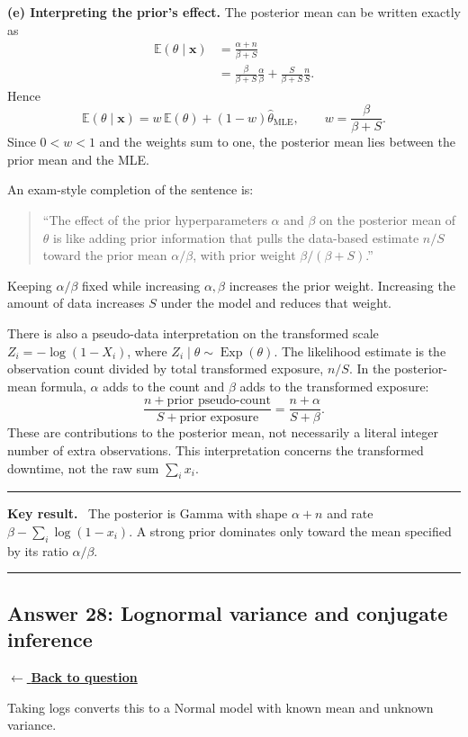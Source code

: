 \documentclass[11pt,a4paper]{article}
\newcommand{\xvec}{\boldsymbol{x}}
\newcommand{\E}{\mathbb{E}}
\newcommand{\answernav}[1]{%
  \label{answer:#1}%
  \noindent\hyperref[question:#1]{$\leftarrow$ \textbf{Back to question}}%
  \par\smallskip}
\newenvironment{keyresult}
  {\begin{center}\begin{minipage}{0.92\linewidth}\color{statblue}%
   \hrule\vspace{6pt}\textbf{Key result.}\ }
  {\vspace{6pt}\hrule\end{minipage}\end{center}}
\begin{document}
\textbf{(e) Interpreting the prior's effect.}
The posterior mean can be written exactly as
\[
\begin{aligned}
\E(\theta\mid\xvec)
&=\frac{\alpha+n}{\beta+S}\\
&=\frac{\beta}{\beta+S}\frac{\alpha}{\beta}
+\frac{S}{\beta+S}\frac nS.
\end{aligned}
\]
Hence
\[
\boxed{\E(\theta\mid\xvec)
=w\,\E(\theta)+(1-w)\widehat\theta_{\mathrm{MLE}},
\qquad w=\frac{\beta}{\beta+S}.}
\]
Since $0<w<1$ and the weights sum to one, the posterior mean lies between
the prior mean and the MLE.

An exam-style completion of the sentence is:
\begin{quote}
``The effect of the prior hyperparameters $\alpha$ and $\beta$ on the
posterior mean of $\theta$ is like adding prior information that pulls the
data-based estimate $n/S$ toward the prior mean $\alpha/\beta$, with prior
weight $\beta/(\beta+S)$.''
\end{quote}
Keeping $\alpha/\beta$ fixed while increasing $\alpha,\beta$ increases
the prior weight. Increasing the amount of data increases $S$ under the
model and reduces that weight.

There is also a pseudo-data interpretation on the transformed scale
$Z_i=-\log(1-X_i)$, where $Z_i\mid\theta\sim\operatorname{Exp}(\theta)$.
The likelihood estimate is the observation count divided by total
transformed exposure, $n/S$. In the posterior-mean formula, $\alpha$ adds
to the count and $\beta$ adds to the transformed exposure:
\[
\frac{n+\text{prior pseudo-count}}{S+\text{prior exposure}}
=\frac{n+\alpha}{S+\beta}.
\]
These are contributions to the posterior mean, not necessarily a literal
integer number of extra observations. This interpretation concerns the
transformed downtime, not the raw sum $\sum_i x_i$.

\begin{keyresult}
The posterior is Gamma with shape $\alpha+n$ and rate
$\beta-\sum_i\log(1-x_i)$. A strong prior dominates only toward the
mean specified by its ratio $\alpha/\beta$.
\end{keyresult}

\clearpage

\subsection{Answer 28: Lognormal variance and conjugate inference}
\answernav{28}

Taking logs converts this to a Normal model with known mean and unknown variance.
\end{document}
